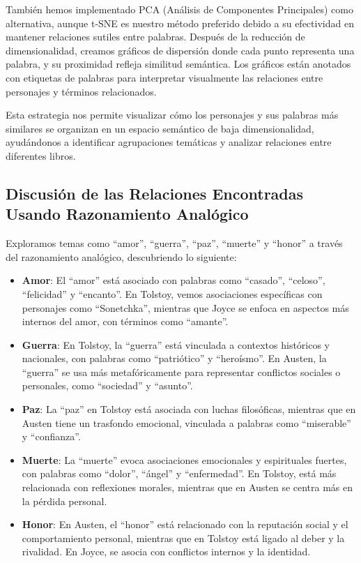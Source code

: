 \documentclass[11pt,english]{article}
\theoremstyle{plain}
\begin{document}
También hemos implementado PCA (Análisis de Componentes Principales) como alternativa, aunque t-SNE es nuestro método preferido debido a su efectividad en mantener relaciones sutiles entre palabras. Después de la reducción de dimensionalidad, creamos gráficos de dispersión donde cada punto representa una palabra, y su proximidad refleja similitud semántica. Los gráficos están anotados con etiquetas de palabras para interpretar visualmente las relaciones entre personajes y términos relacionados.

Esta estrategia nos permite visualizar cómo los personajes y sus palabras más similares se organizan en un espacio semántico de baja dimensionalidad, ayudándonos a identificar agrupaciones temáticas y analizar relaciones entre diferentes libros.

\subsection*{Discusión de las Relaciones Encontradas Usando Razonamiento Analógico}

Exploramos temas como ``amor'', ``guerra'', ``paz'', ``muerte'' y ``honor'' a través del razonamiento analógico, descubriendo lo siguiente:

\begin{itemize}
    \item \textbf{Amor}: El ``amor'' está asociado con palabras como ``casado'', ``celoso'', ``felicidad'' y ``encanto''. En Tolstoy, vemos asociaciones específicas con personajes como ``Sonetchka'', mientras que Joyce se enfoca en aspectos más internos del amor, con términos como ``amante''.
    \item \textbf{Guerra}: En Tolstoy, la ``guerra'' está vinculada a contextos históricos y nacionales, con palabras como ``patriótico'' y ``heroísmo''. En Austen, la ``guerra'' se usa más metafóricamente para representar conflictos sociales o personales, como ``sociedad'' y ``asunto''.
    \item \textbf{Paz}: La ``paz'' en Tolstoy está asociada con luchas filosóficas, mientras que en Austen tiene un trasfondo emocional, vinculada a palabras como ``miserable'' y ``confianza''.
    \item \textbf{Muerte}: La ``muerte'' evoca asociaciones emocionales y espirituales fuertes, con palabras como ``dolor'', ``ángel'' y ``enfermedad''. En Tolstoy, está más relacionada con reflexiones morales, mientras que en Austen se centra más en la pérdida personal.
    \item \textbf{Honor}: En Austen, el ``honor'' está relacionado con la reputación social y el comportamiento personal, mientras que en Tolstoy está ligado al deber y la rivalidad. En Joyce, se asocia con conflictos internos y la identidad.
\end{itemize}
\end{document}
